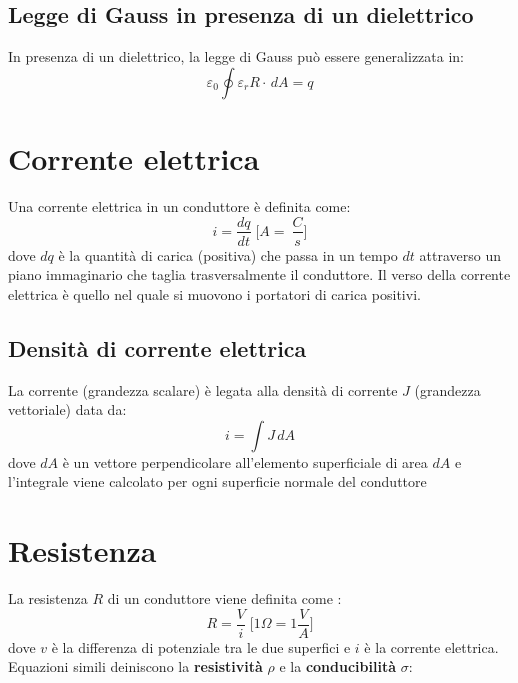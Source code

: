         \subsection{Legge di Gauss in presenza di un dielettrico} In presenza 
        di un dielettrico, la legge di Gauss può essere generalizzata in:
            \begin{equation}
                \varepsilon_0 \oint \varepsilon_rR\cdot\,dA = q
            \end{equation}

    \section{Corrente elettrica} Una corrente elettrica in un conduttore è 
    definita come:
        \begin{equation}
            i = \frac{dq}{dt} \; \Bigg[A = \ \frac{C}{s}\Bigg]
        \end{equation}
    dove $dq$ è la quantità di carica (positiva) che passa in un tempo $dt$ 
    attraverso un piano immaginario che taglia trasversalmente il conduttore.
    Il verso della corrente elettrica è quello nel quale si muovono i portatori
    di carica positivi. 

        \subsection{Densità di corrente elettrica} La corrente (grandezza 
        scalare) è legata alla densità di corrente $J$ (grandezza vettoriale) 
        data da:
            \begin{equation}
                i = \int J \, dA
            \end{equation}
        dove $dA$ è un vettore perpendicolare all'elemento superficiale di area
        $dA$ e l'integrale viene calcolato per ogni superficie normale del 
        conduttore
        
    \section{Resistenza} La resistenza $R$ di un conduttore viene definita come
    :
        \begin{equation}
            R = \frac{V}{i} \; \Bigg[1 \Omega = 1 \frac{V}{A}\Bigg]        
        \end{equation}
    dove $v$ è la differenza di potenziale tra le due superfici e $i$ è la 
    corrente elettrica. Equazioni simili deiniscono la \textbf{resistività} 
    $\rho$ e la \textbf{conducibilità} $\sigma$:
        
